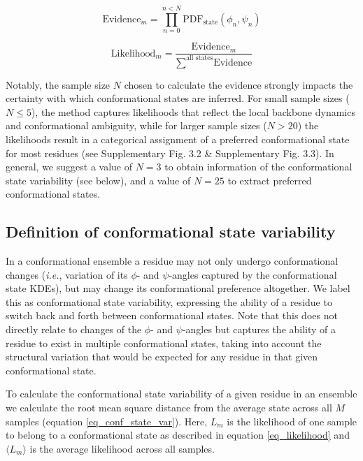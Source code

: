 \begin{equation}
\label{eq_evidence}
\text{Evidence}_m = \prod \limits_{n=0}^{ n < N} \text{PDF}_{\text{state}} (\phi_n, \psi_n)
\end{equation}

\begin{equation}
\label{eq_likelihood}
\text{Likelihood}_m = \frac { 
    \text{Evidence}_m
} {
    \sum\limits^{\text{all states}} \text{Evidence}
}
\end{equation}

Notably, the sample size $N$ chosen to calculate the evidence strongly impacts the certainty with which conformational states are inferred. For small sample sizes ($N \le 5$), the method captures likelihoods that reflect the local backbone dynamics and conformational ambiguity, while for larger sample sizes ($N > 20$) the likelihoods result in a categorical assignment of a preferred conformational state for most residues (see Supplementary Fig. 3.2 \& Supplementary Fig. 3.3).
In general, we suggest a value of $N = 3$ to obtain information of the conformational state variability (see below), and a value of $N = 25$ to extract preferred conformational states. 


\subsection{Definition of conformational state variability} \label{conva_definition}

In a conformational ensemble a residue may not only undergo conformational changes (\textit{i.e.}, variation of its $\phi$- and $\psi$-angles captured by the conformational state KDEs), but may change its conformational preference altogether. We label this as conformational state variability, expressing the ability of a residue to switch back and forth between conformational states. Note that this does not directly relate to changes of the $\phi$- and $\psi$-angles but captures the ability of a residue to exist in multiple conformational states, taking into account the structural variation that would be expected for any residue in that given conformational state.

To calculate the conformational state variability of a given residue in an ensemble we calculate the root mean square distance from the average state across all $M$ samples (equation \ref{eq_conf_state_var}). Here, $L_m$ is the likelihood of one sample to belong to a conformational state as described in equation \ref{eq_likelihood} and $\langle L_m \rangle$ is the average likelihood across all samples.

